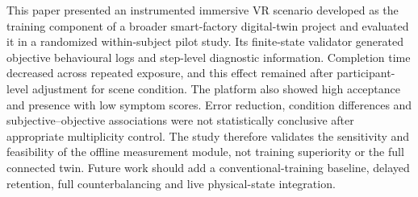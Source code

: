 \documentclass[a4paper,twoside]{article}
\begin{document}
This paper presented an instrumented immersive VR scenario developed as the training component of a broader smart-factory digital-twin project and evaluated it in a randomized within-subject pilot study. Its finite-state validator generated objective behavioural logs and step-level diagnostic information. Completion time decreased across repeated exposure, and this effect remained after participant-level adjustment for scene condition. The platform also showed high acceptance and presence with low symptom scores. Error reduction, condition differences and subjective--objective associations were not statistically conclusive after appropriate multiplicity control. The study therefore validates the sensitivity and feasibility of the offline measurement module, not training superiority or the full connected twin. Future work should add a conventional-training baseline, delayed retention, full counterbalancing and live physical-state integration.



\balance
{\small
}
\end{document}
